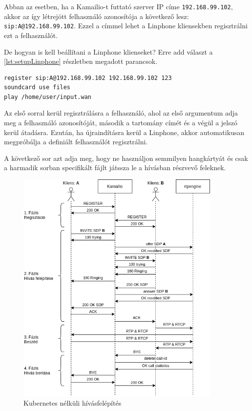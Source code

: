 Abban az esetben, ha a Kamailio-t futtató szerver IP címe \texttt{192.168.99.102}, akkor az így létrejött felhasználó azonosítója a következő lesz: \texttt{sip:A@192.168.99.102}. Ezzel a címmel lehet a Linphone kliensekben regisztrálni ezt a felhasználót. 

De hogyan is kell beállítani a Linphone klienseket? Erre add választ a \ref{lst:setupLinphone} részletben megadott parancsok. 

\begin{lstlisting}[caption=Linphone beállítása, label=lst:setupLinphone]
register sip:A@192.168.99.102 192.168.99.102 123
soundcard use files
play /home/user/input.wan
\end{lstlisting}

Az első sorral kerül regisztrálásra a felhasználó, ahol az első argumentum adja meg a 
felhasználó azonosítóját, második a tartomány címét és a végül a jelszó kerül átadásra. 
Ezután, ha újraindításra kerül a Linphone, akkor automatikusan megpróbálja a definiált
felhasználót regisztrálni. 

A következő sor azt adja meg, hogy ne használjon semmilyen hangkártyát és csak a 
harmadik sorban specifikált fájlt játssza le a hívásban részvevő feleknek.

\begin{figure}[!ht]
	\centering
	\includegraphics[width=0.9\textwidth, keepaspectratio]{figures/basic_call_flow.png}
	\caption{Kubernetes nélküli hívásfelépítés}
	\label{fig:callflow}
\end{figure}

